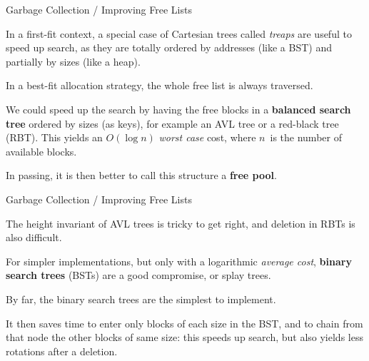\documentclass[compress,dvipdfmx]{beamer}
\begin{document}
%
\begin{frame}{Garbage Collection / Improving Free Lists}

  In a first\hyp{}fit context, a special case of Cartesian trees
  called \emph{treaps} are useful to speed up search, as they are
  totally ordered by addresses (like a BST) and partially by sizes
  (like a heap).

  \bigskip

  In a best\hyp{}fit allocation strategy, the whole free list is
  always traversed.

  \bigskip

  We could speed up the search by having the free blocks in a
  \textbf{balanced search tree} ordered by sizes (as keys), for
  example an AVL tree or a red\hyp{}black tree (RBT). This yields an
  \(O(\log n)\) \emph{worst case} cost, where \(n\)~is the number of
  available blocks.

  \bigskip

  In passing, it is then better to call this structure a \textbf{free
    pool}.

\end{frame}

%
\begin{frame}{Garbage Collection / Improving Free Lists}

  The height invariant of AVL trees is tricky to get right, and
  deletion in RBTs is also difficult.

  \bigskip

  For simpler implementations, but only with a logarithmic
  \emph{average cost}, \textbf{binary search trees} (BSTs) are a good
  compromise, or splay trees.

  \bigskip

  By far, the binary search trees are the simplest to implement.

  \bigskip

  It then saves time to enter only blocks of each size in the BST, and
  to chain from that node the other blocks of same size: this speeds
  up search, but also yields less rotations after a deletion.

\end{frame}
\end{document}
